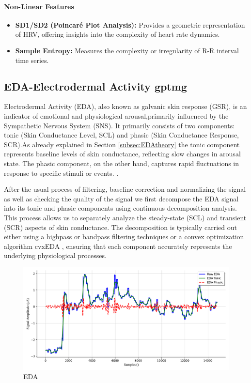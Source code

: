 \paragraph*{Non-Linear Features}
\begin{itemize}
    \item \textbf{SD1/SD2 (Poincaré Plot Analysis):} Provides a geometric representation of HRV, offering insights into the complexity of heart rate dynamics.
    \item \textbf{Sample Entropy:} Measures the complexity or irregularity of R-R interval time series.
\end{itemize}


\subsection{EDA-Electrodermal Activity \gls{gptmg}}

Electrodermal Activity (EDA), also known as galvanic skin response (GSR), is an indicator of emotional and physiological arousal,primarily influenced by the Sympathetic Nervous System (SNS). It primarily consists of two components: tonic (Skin Conductance Level, SCL) and phasic (Skin Conductance Response, SCR).As already explained in Section \ref*{subsec:EDAtheory} the tonic component represents baseline levels of skin conductance, reflecting slow changes in arousal state. The phasic component, on the other hand, captures rapid fluctuations in response to specific stimuli or events. \textcite{electrodermal}.

After the usual process of filtering, baseline correction and normalizing the signal as well as checking the quality of the signal we first decompose the EDA signal into its tonic and phasic components using continuous decomposition analysis. This process allows us to separately analyze the steady-state (SCL) and transient (SCR) aspects of skin conductance.
The decomposition is typically carried out either using a highpass or bandpass filtering techniques or a convex optimization algorithm cvxEDA \parencite{cvxEDA} , ensuring that each component accurately represents the underlying physiological processes.
\begin{figure}[!htbp]
	\centering
	\includegraphics[width=\columnwidth]{images/edaplot.pdf}
	\caption{EDA}
	\label{fig:eda sig}
\end{figure}

